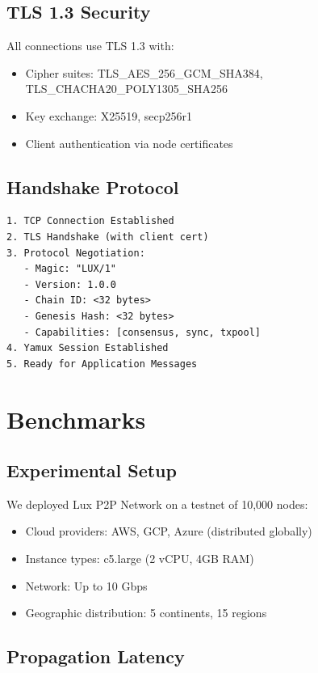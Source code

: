 \documentclass[11pt,a4paper]{article}
\begin{document}
\subsection{TLS 1.3 Security}

All connections use TLS 1.3 with:
\begin{itemize}
    \item Cipher suites: TLS\_AES\_256\_GCM\_SHA384, TLS\_CHACHA20\_POLY1305\_SHA256
    \item Key exchange: X25519, secp256r1
    \item Client authentication via node certificates
\end{itemize}

\subsection{Handshake Protocol}

\begin{lstlisting}
1. TCP Connection Established
2. TLS Handshake (with client cert)
3. Protocol Negotiation:
   - Magic: "LUX/1"
   - Version: 1.0.0
   - Chain ID: <32 bytes>
   - Genesis Hash: <32 bytes>
   - Capabilities: [consensus, sync, txpool]
4. Yamux Session Established
5. Ready for Application Messages
\end{lstlisting}

\section{Benchmarks}

\subsection{Experimental Setup}

We deployed Lux P2P Network on a testnet of 10,000 nodes:
\begin{itemize}
    \item Cloud providers: AWS, GCP, Azure (distributed globally)
    \item Instance types: c5.large (2 vCPU, 4GB RAM)
    \item Network: Up to 10 Gbps
    \item Geographic distribution: 5 continents, 15 regions
\end{itemize}

\subsection{Propagation Latency}
\end{document}
